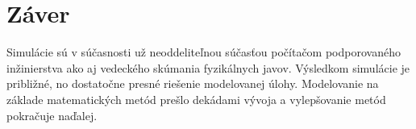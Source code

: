 \documentclass[]{tukediphc}
\begin{document}
\section{Záver}

Simulácie sú v súčasnosti už neoddeliteľnou súčasťou počítačom podporovaného inžinierstva ako aj vedeckého skúmania fyzikálnych javov. Výsledkom simulácie je približné, no dostatočne presné riešenie modelovanej úlohy. Modelovanie na základe matematických metód prešlo dekádami vývoja a vylepšovanie metód pokračuje naďalej.  

%

%
\end{document}
